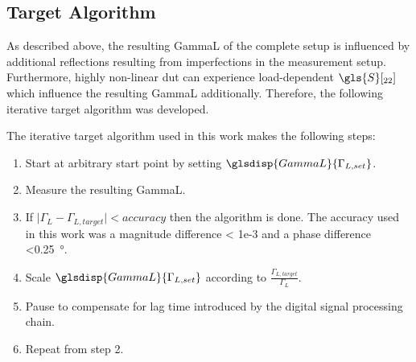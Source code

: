 \documentclass[12pt,a4paper,parskip=full,abstract=true,BCOR=12mm,twoside,open=right]{scrreprt}
\providecommand{\abs}[1]{\lvert#1\rvert}
\begin{document}

\subsection{Target Algorithm}
\label{sec:target}

As described above, the resulting \gls{GammaL} of the complete setup is
influenced by additional reflections resulting from imperfections in the
measurement setup. Furthermore, highly non-linear \gls{dut}
can experience load-dependent $\gls{S}[_{22}]$ which influence
the resulting \gls{GammaL} additionally. Therefore, the following iterative
target algorithm was developed.

The iterative target algorithm used in this work makes the following steps:
\begin{enumerate}
    \item Start at arbitrary start point by setting $\glsdisp{GammaL}{\Gamma_{L,set}}$.
    \item Measure the resulting \gls{GammaL}.
    \item If $\abs{\Gamma_L - \Gamma_{L,target}} < accuracy$ then the algorithm is done. The
        accuracy used in this work was a magnitude difference \num{< 1e-3} and a phase difference \SI{<0.25}{\degree}.
    \item Scale $\glsdisp{GammaL}{\Gamma_{L,set}}$ according to $\frac{\Gamma_{L,target}}{\Gamma_L}$.
    \item Pause to compensate for lag time introduced by the digital signal processing chain.
    \item Repeat from step 2.
\end{enumerate}
\end{document}
